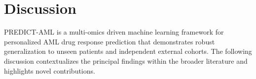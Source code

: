 \documentclass[pdflatex,sn-mathphys-num]{sn-jnl}
\theoremstyle{thmstyleone}
\theoremstyle{thmstyletwo}
\theoremstyle{thmstylethree}
\begin{document}



\section{Discussion}\label{sec4}
PREDICT-AML is a multi-omics driven machine learning framework for personalized AML drug response prediction that demonstrates robust generalization to unseen patients and independent external cohorts. The following discussion contextualizes the principal findings within the broader literature and highlights novel contributions.
\end{document}

